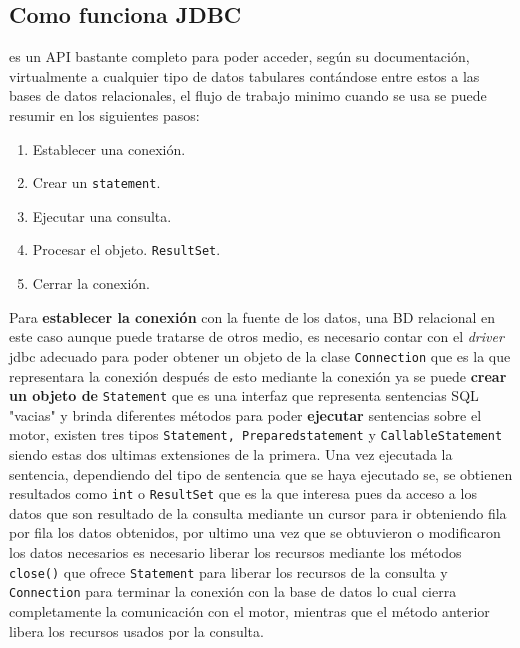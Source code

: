\subsection{Como funciona JDBC}
\jd es un API bastante completo para poder acceder, según su documentación, virtualmente a cualquier tipo de datos tabulares contándose entre estos a las bases de datos relacionales, el flujo de trabajo minimo cuando se usa \jd se puede resumir en los siguientes pasos:
%
\begin{enumerate}
\item Establecer una conexión. %
\item Crear un \verb=statement=. %
\item Ejecutar una consulta. %
\item Procesar el objeto. \verb=ResultSet=. %
\item Cerrar la conexión. %
\end{enumerate}

Para \textbf{establecer la conexión} con la  fuente de los datos, una BD relacional en este caso aunque puede tratarse de otros medio, es necesario contar con el \textit{driver} jdbc adecuado para poder obtener un objeto de la clase \verb=Connection= que es la que representara la conexión después de esto mediante la conexión ya se puede \textbf{crear un objeto de} \verb=Statement= que es una interfaz que representa sentencias SQL "vacias" y brinda diferentes métodos para poder \textbf{ejecutar} sentencias sobre el motor, existen tres tipos \verb=Statement, Preparedstatement= y \verb=CallableStatement= siendo estas dos ultimas extensiones de la primera. Una vez ejecutada la sentencia, dependiendo del tipo de sentencia que se haya ejecutado se, se obtienen resultados como \verb=int= o \verb=ResultSet= que es la que interesa pues da acceso a los datos que son resultado de la consulta mediante un cursor para ir obteniendo fila por fila los datos obtenidos, por ultimo una vez que se obtuvieron o modificaron los datos necesarios es necesario liberar los recursos mediante los métodos \verb=close()= que ofrece \verb=Statement= para liberar los recursos de la consulta y \verb=Connection= para terminar la conexión con la base de datos lo cual cierra completamente la comunicación con el motor, mientras que el método anterior libera los recursos usados por la consulta\citep{java:jdbc:tutorial}.

